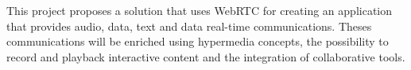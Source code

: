 \documentclass{llncs}
\begin{document}
  This project proposes a solution that uses WebRTC for creating an application that provides audio, data, text and data real-time communications. Theses communications will be enriched using hypermedia concepts, the possibility to record and playback interactive content and the integration of collaborative tools.
  






\end{document}
